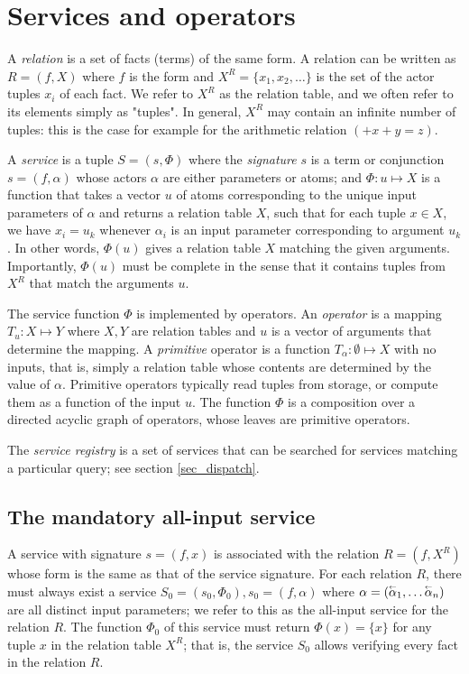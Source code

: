 \documentclass{article}
\theoremstyle{definition}
\newcommand{\parin}[1]{\stackon[1.2pt]{$#1$}{\scalebox{0.6}{$\leftarrow$}}}
\begin{document}
\section{Services and operators}

A \emph{relation} is a set of facts (terms) of the same form. A relation can be written as $R = (f, X)$ where $f$ is the form and $X^R = \{x_1, x_2, \dots \}$ is the set of the actor tuples $x_i$ of each fact. We refer to $X^R$ as the relation table, and we often refer to its elements simply as "tuples". In general, $X^R$ may contain an infinite number of tuples: this is the case for example for the arithmetic relation $(+ x + y = z)$.

A \emph{service} is a tuple $S = (s, \Phi)$ where the \emph{signature} $s$ is a term or conjunction $s = (f, \alpha)$ whose actors $\alpha$ are either parameters or atoms; and $\Phi : u \mapsto X$ is a function that takes a vector $u$ of atoms corresponding to the unique input parameters of $\alpha$ and returns a relation table $X$, such that for each tuple $x \in X$, we have $x_i = u_k$ whenever $\alpha_i$ is an input parameter corresponding to argument $u_k$. In other words, $\Phi(u)$ gives a relation table $X$ matching the given arguments. Importantly, $\Phi(u)$ must be complete in the sense that it contains tuples from $X^R$ that match the arguments $u$.

The service function $\Phi$ is implemented by operators. An \emph{operator} is a mapping $T_u: X \mapsto Y$ where $X,Y$ are relation tables and $u$ is a vector of arguments that determine the mapping. A \emph{primitive} operator is a function $T_\alpha : \emptyset \mapsto X$ with no inputs, that is, simply a relation table whose contents are determined by the value of $\alpha$. Primitive operators typically read tuples from storage, or compute them as a function of the input $u$. The function $\Phi$ is a composition over a directed acyclic graph of operators, whose leaves are primitive operators.

The \emph{service registry} is a set of services that can be searched for services matching a particular query; see section \ref{sec_dispatch}.

\subsection{The mandatory all-input service}

A service with signature $s = (f, x)$ is associated with the relation $R = (f, X^R)$ whose form is the same as that of the service signature. For each relation $R$, there must always exist a service $S_0 = (s_0, \Phi_0), s_0 = (f, \alpha)$ where $\alpha = (\parin{\alpha}_1, \dots \parin{\alpha}_n)$ are all distinct input parameters; we refer to this as the all-input service for the relation $R$. The function $\Phi_0$ of this service must return $\Phi(x) = \{x\}$ for any tuple $x$ in the relation table $X^R$; that is, the service $S_0$ allows verifying every fact in the relation $R$.
\end{document}
